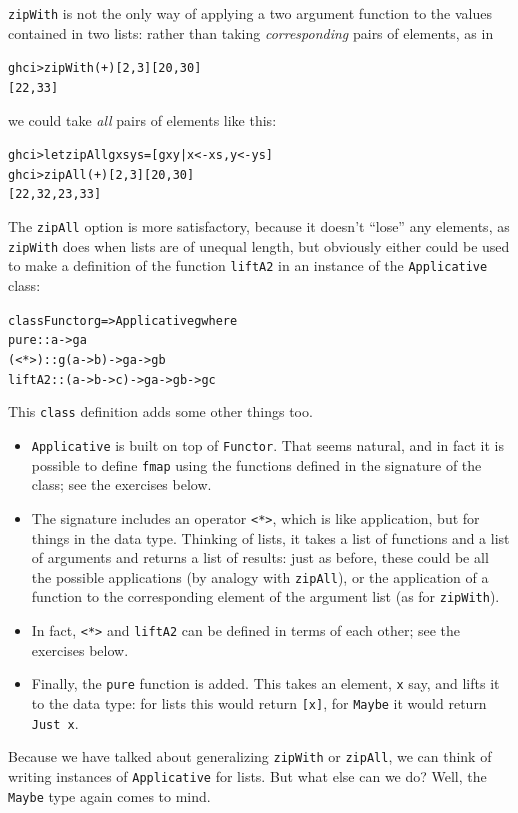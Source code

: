 \texttt{zipWith} is not the only way of applying a two argument function to the values contained in two lists: rather than taking \emph{corresponding} pairs of elements, as in 
\begin{alltt}
ghci> zipWith (+) [2,3] [20,30]
[22,33]
\end{alltt}
we could take \emph{all} pairs of elements like this:
\begin{alltt}
ghci> let zipAll g xs ys = [ g x y | x<-xs, y<-ys ]
ghci> zipAll (+) [2,3] [20,30]
[22,32,23,33]
\end{alltt}
The \texttt{zipAll} option is more satisfactory, because it doesn't ``lose'' any elements, as \texttt{zipWith} does when lists are of unequal length, but obviously either could be used to make a definition of the function \texttt{liftA2} in an instance of the \texttt{Applicative} class:
\begin{alltt}
class Functor g => Applicative g where
  pure :: a -> g a
  (<*>) :: g (a -> b) -> g a -> g b
  liftA2 :: (a -> b -> c) -> g a -> g b -> g c   
\end{alltt}
This \texttt{class} definition adds some other things too.
\begin{itemize}
\item
\texttt{Applicative} is built on top of \texttt{Functor}. That seems natural, and in fact it is possible to define \texttt{fmap} using the functions defined in the signature of the class; see the exercises below.
\item
The signature includes an operator \texttt{<*>}, which is like application, but for things in the data type. Thinking of lists, it takes a list of functions and a list of arguments and returns a list of results: just as before, these could be all the possible applications (by analogy with \texttt{zipAll}), or the application of a function to the corresponding element of the argument list (as for \texttt{zipWith}).
\item 
In fact, \texttt{<*>} and \texttt{liftA2} can be defined in terms of each other; see the exercises below.
\item 
Finally, the \texttt{pure} function is added. This takes an element, \texttt{x} say, and lifts it to the data type: for lists this would return \texttt{[x]}, for \texttt{Maybe} it would return \texttt{Just x}.
\end{itemize}
Because we have talked about generalizing \texttt{zipWith} or \texttt{zipAll}, we can think of writing instances of \texttt{Applicative} for lists. But what else can we do? Well, the \texttt{Maybe} type again comes to mind.
